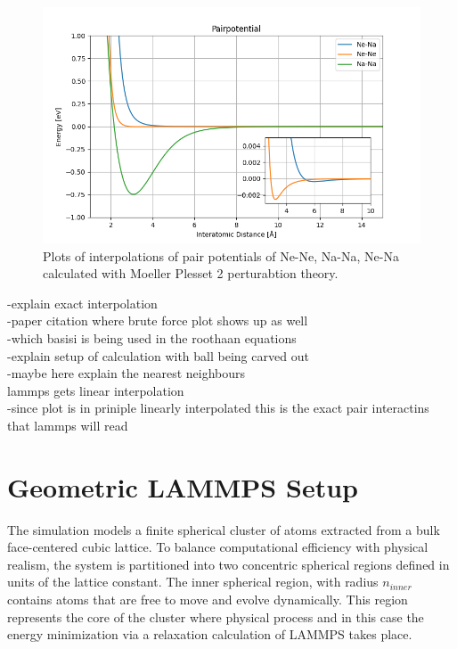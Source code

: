\begin{figure}[h!]
	\centering
	\includegraphics[scale = 0.7]{Inhalt/Bilder/pairpotential.png}
	\caption{Plots of interpolations of pair potentials of Ne-Ne, Na-Na, Ne-Na calculated with Moeller Plesset 2 perturabtion theory.}
	\label{fig:pairpotential}
\end{figure}
-explain exact interpolation\\
-paper citation where brute force plot shows up as well\\
-which basisi is being used in the roothaan equations \\
-explain setup of calculation with ball being carved out\\
-maybe here explain the nearest neighbours\\
lammps gets linear interpolation\\
-since plot is in priniple linearly interpolated this is the exact pair interactins that lammps will read
\section{Geometric LAMMPS Setup}
The simulation models a finite spherical cluster of atoms extracted from a bulk face-centered cubic lattice. To balance computational efficiency with physical realism, the system is partitioned into two concentric spherical regions defined in units of the lattice constant. The inner spherical region, with radius $n_{inner}$ contains atoms that are free to move and evolve dynamically. This region represents the core of the cluster where physical process and in this case the energy minimization via a relaxation calculation of \ac{LAMMPS} takes place.


